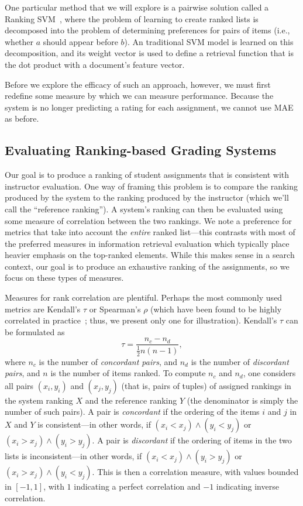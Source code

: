One particular method that we will explore is a pairwise solution called a
Ranking SVM~\cite{Joachims:2002:KDD}, where the problem of learning to
create ranked lists is decomposed into the problem of determining
preferences for pairs of items (i.e., whether $a$ should appear before
$b$). An traditional SVM model is learned on this decomposition, and its
weight vector is used to define a retrieval function that is the dot
product with a document's feature vector.

Before we explore the efficacy of such an approach, however, we must first
redefine some measure by which we can measure performance. Because the
system is no longer predicting a rating for each assignment, we cannot use
MAE as before.

\subsection{Evaluating Ranking-based Grading Systems}
Our goal is to produce a ranking of student assignments that is consistent
with instructor evaluation. One way of framing this problem is to compare
the ranking produced by the system to the ranking produced by the
instructor (which we'll call the ``reference ranking''). A system's ranking
can then be evaluated using some measure of correlation between the two
rankings. We note a preference for metrics that take into account the
\emph{entire} ranked list---this contrasts with most of the preferred
measures in information retrieval evaluation which typically place heavier
emphasis on the top-ranked elements. While this makes sense in a search
context, our goal is to produce an exhaustive ranking of the assignments,
so we focus on these types of measures.

Measures for rank correlation are plentiful. Perhaps the most commonly
used metrics are Kendall's $\tau$ or Spearman's $\rho$ (which have been
found to be highly correlated in practice~\cite{Shani:2011:Springer}; thus,
we present only one for illustration). Kendall's $\tau$ can be formulated
as
\[
    \tau = \frac{n_c - n_d}{\frac{1}{2} n (n-1)},
\]
where $n_c$ is the number of \emph{concordant pairs}, and $n_d$ is the number
of \emph{discordant pairs}, and $n$ is the number of items ranked. To
compute $n_c$ and $n_d$, one considers all pairs $(x_i, y_i)$ and $(x_j,
y_j)$ (that is, pairs of tuples) of assigned rankings in the system ranking
$X$ and the reference ranking $Y$ (the denominator is simply the number of
such pairs). A pair is \emph{concordant} if the ordering of the items $i$
and $j$ in $X$ and $Y$ is consistent---in other words, if $(x_i < x_j)
\land (y_i < y_j)$ or $(x_i > x_j) \land (y_i > y_j)$.  A pair is
\emph{discordant} if the ordering of items in the two lists is
inconsistent---in other words, if $(x_i < x_j) \land (y_i > y_j)$ or $(x_i
> x_j) \land (y_i < y_j)$. This is then a correlation measure, with values
bounded in $[-1, 1]$, with $1$ indicating a perfect correlation and $-1$
indicating inverse correlation.

